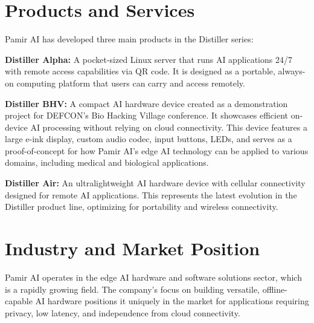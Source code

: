 \documentclass[12pt,a4paper]{report}
\begin{document}
\section{Products and Services}

Pamir AI has developed three main products in the Distiller series:

\vspace{0.3cm}

\textbf{Distiller Alpha:} A pocket-sized Linux server that runs AI applications 24/7 with remote access capabilities via QR code. It is designed as a portable, always-on computing platform that users can carry and access remotely.

\vspace{0.3cm}

\textbf{Distiller BHV:} A compact AI hardware device created as a demonstration project for DEFCON's Bio Hacking Village conference. It showcases efficient on-device AI processing without relying on cloud connectivity. This device features a large e-ink display, custom audio codec, input buttons, LEDs, and serves as a proof-of-concept for how Pamir AI's edge AI technology can be applied to various domains, including medical and biological applications.

\vspace{0.3cm}

\textbf{Distiller Air:} An ultralightweight AI hardware device with cellular connectivity designed for remote AI applications. This represents the latest evolution in the Distiller product line, optimizing for portability and wireless connectivity.


\section{Industry and Market Position}

Pamir AI operates in the edge AI hardware and software solutions sector, which is a rapidly growing field. The company's focus on building versatile, offline-capable AI hardware positions it uniquely in the market for applications requiring privacy, low latency, and independence from cloud connectivity.
\end{document}
